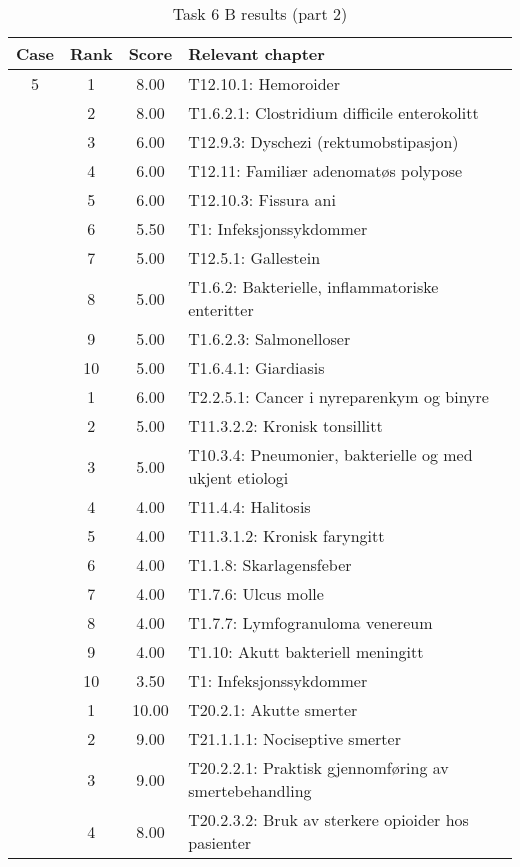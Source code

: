 \begin{table}[htbp] \footnotesize \center
\caption{Task 6 B results (part 2)\label{tab:task6b2}}
\begin{tabular}{c c c l}
    \toprule
    Case & Rank & Score & Relevant chapter \\
    \midrule
    5 & 1 & 8.00 & T12.10.1: Hemoroider \\
     & 2 & 8.00 & T1.6.2.1: Clostridium difficile enterokolitt \\
     & 3 & 6.00 & T12.9.3: Dyschezi (rektumobstipasjon) \\
     & 4 & 6.00 & T12.11: Familiær adenomatøs polypose \\
     & 5 & 6.00 & T12.10.3: Fissura ani \\
     & 6 & 5.50 & T1: Infeksjonssykdommer \\
     & 7 & 5.00 & T12.5.1: Gallestein \\
     & 8 & 5.00 & T1.6.2: Bakterielle, inflammatoriske enteritter \\
     & 9 & 5.00 & T1.6.2.3: Salmonelloser \\
     & 10 & 5.00 & T1.6.4.1: Giardiasis \\
	\addlinespace
    6 & 1 & 6.00 & T2.2.5.1: Cancer i nyreparenkym og binyre \\
     & 2 & 5.00 & T11.3.2.2: Kronisk tonsillitt \\
     & 3 & 5.00 & T10.3.4: Pneumonier, bakterielle og med ukjent etiologi \\
     & 4 & 4.00 & T11.4.4: Halitosis \\
     & 5 & 4.00 & T11.3.1.2: Kronisk faryngitt \\
     & 6 & 4.00 & T1.1.8: Skarlagensfeber \\
     & 7 & 4.00 & T1.7.6: Ulcus molle \\
     & 8 & 4.00 & T1.7.7: Lymfogranuloma venereum \\
     & 9 & 4.00 & T1.10: Akutt bakteriell meningitt \\
     & 10 & 3.50 & T1: Infeksjonssykdommer \\
	\addlinespace
    7 & 1 & 10.00 & T20.2.1: Akutte smerter \\
     & 2 & 9.00 & T21.1.1.1: Nociseptive smerter \\
     & 3 & 9.00 & T20.2.2.1: Praktisk gjennomføring av smertebehandling \\%
     & 4 & 8.00 & T20.2.3.2: Bruk av sterkere opioider hos pasienter \\%

\end{tabular}
\end{table}

